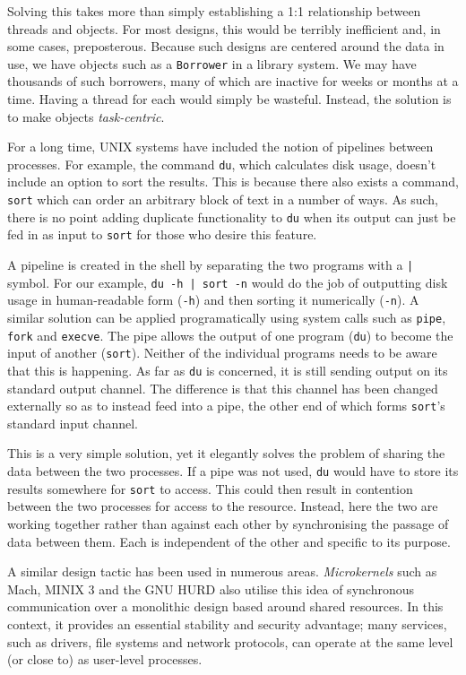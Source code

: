 Solving this takes more than simply establishing a 1:1 relationship
between threads and objects.  For most designs, this would be terribly
inefficient and, in some cases, preposterous.  Because such designs
are centered around the data in use, we have objects such as a
\texttt{Borrower} in a library system.  We may have thousands of such
borrowers, many of which are inactive for weeks or months at a time.
Having a thread for each would simply be wasteful.  Instead, the
solution is to make objects \emph{task-centric}.

For a long time, UNIX systems have included the notion of pipelines
between processes.  For example, the command \texttt{du}, which
calculates disk usage, doesn't include an option to sort the results.
This is because there also exists a command, \texttt{sort} which can
order an arbitrary block of text in a number of ways.  As such, there
is no point adding duplicate functionality to \texttt{du} when its
output can just be fed in as input to \texttt{sort} for those who
desire this feature.

A pipeline is created in the shell by separating the two programs with
a \texttt{|} symbol.  For our example, \texttt{du -h | sort -n} would
do the job of outputting disk usage in human-readable form
(\texttt{-h}) and then sorting it numerically (\texttt{-n}).  A
similar solution can be applied programatically using system calls
such as \texttt{pipe}, \texttt{fork} and \texttt{execve}.  The pipe
allows the output of one program (\texttt{du}) to become the input of
another (\texttt{sort}).  Neither of the individual programs needs to
be aware that this is happening.  As far as \texttt{du} is concerned,
it is still sending output on its standard output channel.  The
difference is that this channel has been changed externally so as to
instead feed into a pipe, the other end of which forms \texttt{sort}'s
standard input channel.

This is a very simple solution, yet it elegantly solves the problem of
sharing the data between the two processes.  If a pipe was not used,
\texttt{du} would have to store its results somewhere for
\texttt{sort} to access.  This could then result in contention between
the two processes for access to the resource.  Instead, here the two
are working together rather than against each other by synchronising
the passage of data between them.  Each is independent of the other
and specific to its purpose.

A similar design tactic has been used in numerous areas.
\emph{Microkernels} such as Mach\cite{mach}, MINIX 3\cite{minix3} and
the GNU HURD\cite{hurd} also utilise this idea of synchronous
communication over a monolithic design based around shared resources.
In this context, it provides an essential stability and security
advantage; many services, such as drivers, file systems and network
protocols, can operate at the same level (or close to) as user-level
processes.

